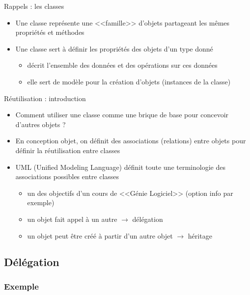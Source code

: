
\begin{frame}{Rappels : les classes}
\begin{itemize}
	\item Une classe représente une <<famille>> d'objets partageant les mêmes propriétés et méthodes
	\item Une classe sert à définir les propriétés des objets d'un type donné
	\begin{itemize}
		\item décrit l'ensemble des données et des opérations sur ces données
		\item elle sert de modèle pour la création d'objets (instances de la classe)
	\end{itemize}
\end{itemize}
\end{frame}

\begin{frame}{Réutilisation : introduction}
\begin{itemize}
	\item Comment utiliser une classe comme une brique de base pour concevoir d'autres objets ?
	\item En conception objet, on définit des associations (relations) entre objets pour définir la réutilisation entre classes
	\item UML (Unified Modeling Language) définit toute une terminologie des associations possibles entre classes
	\begin{itemize}
		\item un des objectifs d'un cours de <<Génie Logiciel>> (option info par exemple)
		\item un objet fait appel à un autre $\longrightarrow$ délégation
		\item un objet peut être créé à partir d'un autre objet $\longrightarrow$ héritage
	\end{itemize}
\end{itemize}
\end{frame}

\subsection{Délégation}
\subsubsection*{Exemple}

